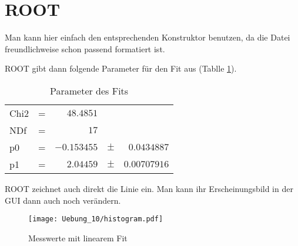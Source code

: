 
\part{ROOT}

Man kann hier einfach den entsprechenden Konstruktor benutzen, da die Datei freundlichweise schon passend formatiert ist.


ROOT gibt dann folgende Parameter für den Fit aus (Tablle \ref{table:fit}).

\begin{table}[h]
\begin{center}
\begin{tabular}{lcrcr}
Chi2 & = & $48.4851$ &  \\ 
NDf & = & $17$ &  \\ 
p0 & = & $-0.153455$ & $\pm$ & $0.0434887$ \\ 
p1 & = & $2.04459$ & $\pm$ & $0.00707916$ \\ 
\end{tabular} 
\caption{Parameter des Fits}
\label{table:fit}
\end{center}
\end{table}

ROOT zeichnet auch direkt die Linie ein. Man kann ihr Erscheinungsbild in der GUI dann auch noch verändern.


\begin{figure}[h]
\begin{center}
\texttt{[image: Uebung\_10/histogram.pdf]}
\caption{Messwerte mit linearem Fit}
\end{center}
\end{figure}
